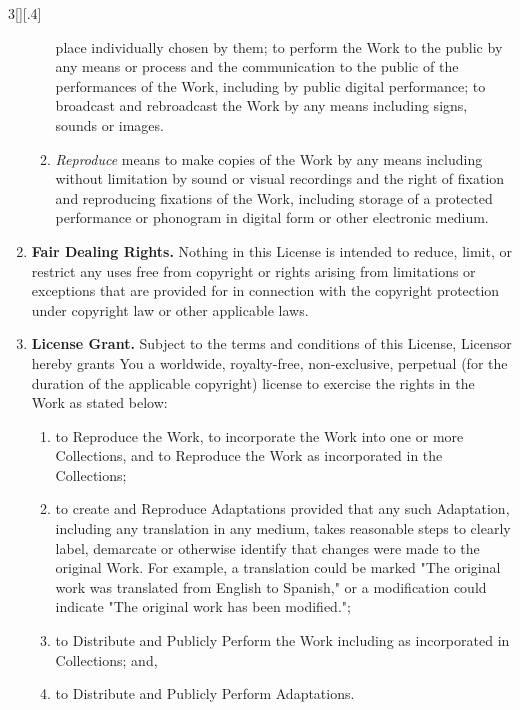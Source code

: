 \documentclass[8pt,a4paper]{article}
\begin{document}
\begin{multicols}{3}[][.4\paperwidth]
\begin{enumerate}
\begin{enumerate}
        place individually chosen by them; to perform the Work to the public
        by any means or process and the communication to the public of the
        performances of the Work, including by public digital performance; to
        broadcast and rebroadcast the Work by any means including signs,
        sounds or images.
  \item \emph{Reproduce} means to make copies of the Work by any means including
        without limitation by sound or visual recordings and the right of
        fixation and reproducing fixations of the Work, including storage of a
        protected performance or phonogram in digital form or other electronic
        medium.

 \end{enumerate}  
 
 \item \textbf{Fair Dealing Rights.} Nothing in this License is intended to reduce,
    limit, or restrict any uses free from copyright or rights arising from
    limitations or exceptions that are provided for in connection with the
    copyright protection under copyright law or other applicable laws.
 
 \item \textbf{License Grant.} Subject to the terms and conditions of this License,
    Licensor hereby grants You a worldwide, royalty-free, non-exclusive,
    perpetual (for the duration of the applicable copyright) license to
    exercise the rights in the Work as stated below:
 
 \begin{enumerate}

  \item to Reproduce the Work, to incorporate the Work into one or more
        Collections, and to Reproduce the Work as incorporated in the
        Collections;
  \item to create and Reproduce Adaptations provided that any such Adaptation,
        including any translation in any medium, takes reasonable steps to
        clearly label, demarcate or otherwise identify that changes were made
        to the original Work. For example, a translation could be marked "The
        original work was translated from English to Spanish," or a
        modification could indicate "The original work has been modified.";
  \item to Distribute and Publicly Perform the Work including as incorporated
        in Collections; and,
  \item to Distribute and Publicly Perform Adaptations.


\end{enumerate}
\end{enumerate}
\end{multicols}
\end{document}
